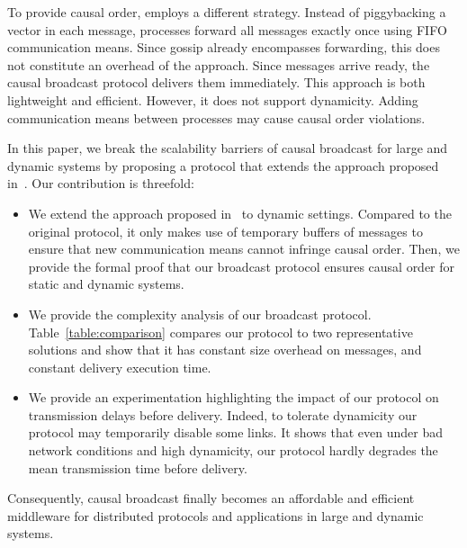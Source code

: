 
To provide causal order, \cite{friedman2004causal} employs a different
strategy. Instead of piggybacking a vector in each message, processes forward
all messages exactly once using FIFO communication means. Since gossip already
encompasses forwarding, this does not constitute an overhead of the
approach. Since messages arrive ready, the causal broadcast protocol delivers
them immediately. This approach is both lightweight and efficient. However, it
does not support dynamicity. Adding communication means between processes may
cause causal order violations.


In this paper, we break the scalability barriers of causal broadcast for large
and dynamic systems by proposing a protocol that extends the approach proposed
in~\cite{friedman2004causal}.  Our contribution is threefold:
\begin{itemize}[leftmargin=*]
\item We extend the approach proposed in~\cite{friedman2004causal} to dynamic
  settings. Compared to the original protocol, it only makes use of temporary
  buffers of messages to ensure that new communication means cannot infringe
  causal order.  Then, we provide the formal proof that our broadcast protocol
  ensures causal order for static and dynamic systems.
\item We provide the complexity analysis of our broadcast
  protocol. Table~\ref{table:comparison} compares our protocol to two
  representative solutions and show that it has constant size overhead on
  messages, and constant delivery execution time.
\item We provide an experimentation highlighting the impact of our protocol on
  transmission delays before delivery. Indeed, to tolerate dynamicity our
  protocol may temporarily disable some links.  It shows that even under bad
  network conditions and high dynamicity, our protocol hardly degrades
  the mean transmission time before delivery.
\end{itemize}
Consequently, causal broadcast finally becomes an affordable and efficient
middleware for distributed protocols and applications in large and dynamic
systems.

